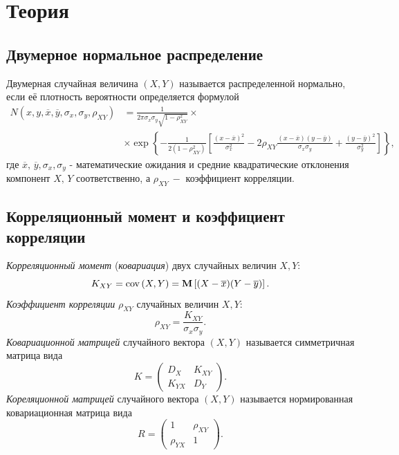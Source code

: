 \documentclass[a4paper]{article}
\begin{document}
\section{Теория}
\subsection{Двумерное нормальное распределение}
Двумерная случайная величина $(X, Y)$ называется распределенной нормально, если её плотность вероятности определяется формулой
\begin{align}
    N(x,y,\overline{x},\overline{y},\sigma_x,\sigma_y,\rho_{XY}^{})&=\frac{1}{2\pi\sigma_x\sigma_y\sqrt{1-\rho_{XY}^2}}\times\nonumber\\
    &\times\exp\left\{-\frac{1}{2(1-\rho_{XY}^2)}\left[\frac{\left(x-\overline{x}\right)^2}{\sigma_x^2}-2\rho_{XY}^{}\frac{(x-\overline{x})(y-\overline{y})}{\sigma_x\sigma_y}+\frac{\left(y-\overline{y}\right)^2}{\sigma_y^2}\right]\right\},
\end{align}
где $\overline{x},\,\overline{y},\sigma_x,\sigma_y$ - математические ожидания и средние квадратические отклонения компонент $X,\,Y$ соответственно, а $\rho_{XY}^{}\:-$ коэффициент корреляции. 
\subsection{Корреляционный момент и коэффициент корреляции}
\textit{Корреляционный момент} (\textit{ковариация}) двух случайных величин $X, Y$:
\begin{equation}
    K_{XY} = \operatorname{cov}{(X,Y)}=\mathbf{M}\left[(X-\overline{x})(Y-\overline{y})\right].
\end{equation}
\textit{Коэффициент корреляции} $\rho_{XY}$ случайных величин $X,Y$:
\begin{equation}\label{eq::rho}
    \rho_{XY}^{}=\frac{K_{XY}}{\sigma_x\sigma_y}.
\end{equation}
\textit{Ковариационной матрицей} случайного вектора $(X,Y)$ называется симметричная матрица вида
\begin{equation}
    K=\begin{pmatrix}
    D_X & K_{XY} \\
    K_{YX} & D_Y
    \end{pmatrix}.
\end{equation}
\textit{Кореляционной матрицей} случайного вектора $(X,Y)$ называется нормированная ковариационная матрица вида
\begin{equation}
    R=\begin{pmatrix}
    1 & \rho_{XY}^{} \\
    \rho_{YX}^{} & 1
    \end{pmatrix}.
\end{equation}
\end{document}
